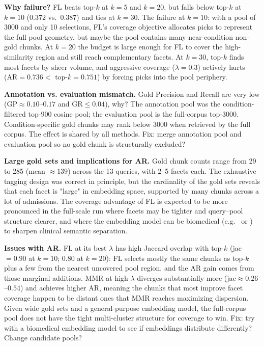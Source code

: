 \documentclass[11pt,a4paper]{article}
\newcommand{\fname}[1]{\path{#1}}
\begin{document}
\textbf{Why failure?} FL beats top-$k$ at $k=5$ and $k=20$, but falls below top-$k$ at $k=10$ (0.372 vs.\ 0.387) and ties at $k=30$. The failure at $k=10$: with a pool of 3000 and only 10 selections, FL's coverage objective allocates picks to represent the full pool geometry, but maybe the pool contains many near-condition non-gold chunks. At $k=20$ the budget is large enough for FL to cover the high-similarity region and still reach complementary facets. At $k=30$, top-$k$ finds most facets by sheer volume, and aggressive coverage ($\lambda=0.3$) actively hurts (AR$=0.736 <$ top-$k=0.751$) by forcing picks into the pool periphery.

\textbf{Annotation vs. evaluation mismatch.} Gold Precision and Recall are very low (GP$\approx 0.10$--$0.17$ and GR$\leq 0.04$), why? The annotation pool was the condition-filtered top-900 cosine pool; the evaluation pool is the full-corpus top-3000. Condition-specific gold chunks may rank below 3000 when retrieved by the full corpus. The effect is shared by all methods. Fix: merge annotation pool and evaluation pool so no gold chunk is structurally excluded?

\textbf{Large gold sets and implications for AR.} Gold chunk counts range from 29 to 285 (mean $\approx 139$) across the 13 queries, with 2--5 facets each. The exhaustive tagging design was correct in principle, but the cardinality of the gold sets reveals that each facet is "large" in embedding space, supported by many chunks across a lot of admissions. The coverage advantage of FL is expected to be more pronounced in the full-scale run where facets may be tighter and query--pool structure clearer, and where the embedding model can be biomedical (e.g.\ \fname{BioBERT} or \fname{MedCPT}) to sharpen clinical semantic separation.

\textbf{Issues with AR.} FL at its best $\lambda$ has high Jaccard overlap with top-$k$ (jac$=0.90$ at $k=10$; $0.80$ at $k=20$): FL selects mostly the same chunks as top-$k$ plus a few from the nearest uncovered pool region, and the AR gain comes from those marginal additions. MMR at high $\lambda$ diverges substantially more (jac$\approx 0.26$--$0.54$) and achieves higher AR, meaning the chunks that most improve facet coverage happen to be distant ones that MMR reaches maximizing dispersion. Given wide gold sets and a general-purpose embedding model, the full-corpus pool does not have the tight multi-cluster structure for coverage to win. Fix: try with a biomedical embedding model to see if embeddings distribute differently? Change candidate pools?
\end{document}
